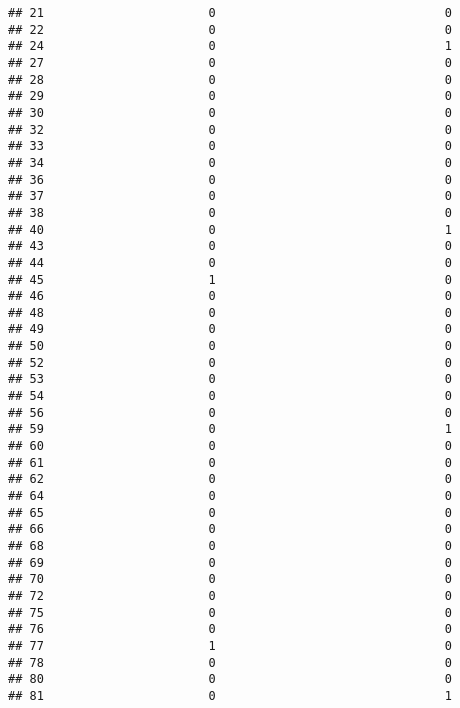 \documentclass[
]{article}
\begin{document}
\begin{verbatim}
## 21                       0                                0
## 22                       0                                0
## 24                       0                                1
## 27                       0                                0
## 28                       0                                0
## 29                       0                                0
## 30                       0                                0
## 32                       0                                0
## 33                       0                                0
## 34                       0                                0
## 36                       0                                0
## 37                       0                                0
## 38                       0                                0
## 40                       0                                1
## 43                       0                                0
## 44                       0                                0
## 45                       1                                0
## 46                       0                                0
## 48                       0                                0
## 49                       0                                0
## 50                       0                                0
## 52                       0                                0
## 53                       0                                0
## 54                       0                                0
## 56                       0                                0
## 59                       0                                1
## 60                       0                                0
## 61                       0                                0
## 62                       0                                0
## 64                       0                                0
## 65                       0                                0
## 66                       0                                0
## 68                       0                                0
## 69                       0                                0
## 70                       0                                0
## 72                       0                                0
## 75                       0                                0
## 76                       0                                0
## 77                       1                                0
## 78                       0                                0
## 80                       0                                0
## 81                       0                                1

\end{verbatim}
\end{document}
